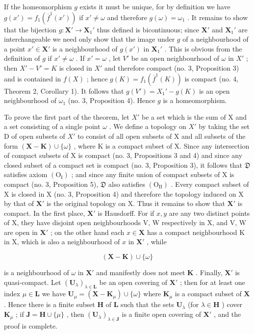 If the homeomorphism \(g\) exists it must be unique, for by definition we have \(g(x') = f_1(\overline{f}^1 (x'))\) if \(x' \neq \omega\) and therefore \(g(\omega) = \omega_1\) . It remains to show that the bijection \(g: \mathbf{X}' \to \mathbf{X}_1'\) thus defined is bicontinuous; since \(\mathbf{X}'\) and \(\mathbf{X}_1'\) are interchangeable we need only show that the image under \(g\) of a neighbourhood of a point \(x' \in \mathbf{X}'\) is a neighbourhood of \(g(x')\) in \(\mathbf{X}_1'\) . This is obvious from the definition of \(g\) if \(x' \neq \omega\) . If \(x' = \omega\) , let \(V'\) be an open neighbourhood of \(\omega\) in \(X'\) ; then \(X' - V' = K\) is closed in \(X'\) and therefore compact (no. 3, Proposition 3) and is contained in \(f(X)\) ; hence \(g(K) = f_1(\overline{f}^1 (K))\) is compact (no. 4, Theorem 2, Corollary 1). It follows that \(g(V') = X_1' - g(K)\) is an open neighbourhood of \(\omega_1\) (no. 3, Proposition 4). Hence \(g\) is a homeomorphism.

To prove the first part of the theorem, let \(X'\) be a set which is the sum of X and a set consisting of a single point \(\omega\) . We define a topology on \(X'\) by taking the set D of open subsets of \(X'\) to consist of all open subsets of X and all subsets of the form \((\mathbf{X}-\mathbf{K})\cup\{\omega\}\) , where K is a compact subset of X. Since any intersection of compact subsets of X is compact (no. 3, Propositions 3 and 4) and since any closed subset of a compact set is compact (no. 3, Proposition 3), it follows that \(\mathfrak{D}\) satisfies axiom \((\mathrm{O_I})\) ; and since any finite union of compact subsets of X is compact (no. 3, Proposition 5), \(\mathfrak{D}\) also satisfies \((\mathrm{O_{II}})\) . Every compact subset of X is closed in X (no. 3, Proposition 4) and therefore the topology induced on X by that of \(\mathbf{X}'\) is the original topology on X. Thus it remains to show that \(\mathbf{X}'\) is compact. In the first place, \(\mathbf{X}'\) is Hausdorff. For if \(x, y\) are any two distinct points of X, they have disjoint open neighbourhoods V, W respectively in X, and V, W are open in \(\mathbf{X}'\) ; on the other hand each \(x \in \mathbf{X}\) has a compact neighbourhood K in X, which is also a neighbourhood of \(x\) in \(\mathbf{X}'\) , while

\[
(\mathbf {X} - \mathbf {K}) \cup \{\omega \}
\]

is a neighbourhood of \(\omega\) in \(\mathbf{X}'\) and manifestly does not meet \(\mathbf{K}\) . Finally, \(\mathbf{X}'\) is quasi-compact. Let \((\mathbf{U}_{\lambda})_{\lambda \in \mathbf{L}}\) be an open covering of \(\mathbf{X}'\) ; then for at least one index \(\mu \in \mathbf{L}\) we have \(\mathbf{U}_{\mu} = (\mathbf{X} - \mathbf{K}_{\mu}) \cup \{\omega\}\) where \(\mathbf{K}_{\mu}\) is a compact subset of \(\mathbf{X}\) . Hence there is a finite subset \(\mathbf{H}\) of \(\mathbf{L}\) such that the sets \(\mathbf{U}_{\lambda}\) (for \(\lambda \in \mathbf{H}\) ) cover \(\mathbf{K}_{\mu}\) ; if \(\mathbf{J} = \mathbf{H} \cup \{\mu\}\) , then \((\mathbf{U}_{\lambda})_{\lambda \in \mathbf{J}}\) is a finite open covering of \(\mathbf{X}'\) , and the proof is complete.

